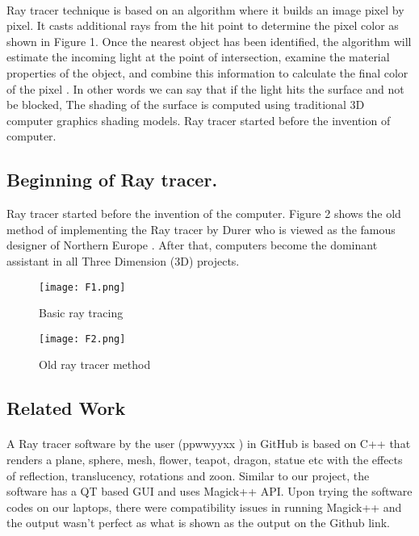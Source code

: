 \documentclass{article}
\begin{document}
\paragraph{}
Ray tracer technique is based on an algorithm where it builds an image pixel by pixel. It casts additional rays from the hit point to determine the pixel color as shown in Figure 1.
Once the nearest object has been identified, the algorithm will estimate the incoming light at the point of intersection, examine the material properties of the object, and combine this information to calculate the final color of the pixel \cite{2}. In other words we can say that if the light hits the surface and not be blocked,  The shading of the surface is computed using traditional 3D computer graphics shading models. 
Ray tracer started before the invention of computer. 


\subsection{Beginning of Ray tracer.} 
Ray tracer started before the invention of the computer. Figure 2 shows the old method of implementing the Ray tracer by Durer who is viewed as the famous designer of Northern Europe \cite{6}. After that, computers become the dominant assistant in all Three Dimension (3D) projects.

\begin{figure}
    \centering
    \texttt{[image: F1.png]}
    \caption{Basic ray tracing}
    \label{figure1}
\end{figure}

\begin{figure}[!h]
\centering
\texttt{[image: F2.png]}
\caption{Old ray tracer method \label{fig2}}
\end{figure}

\subsection{Related Work}
\paragraph{}
A Ray tracer software by the user (ppwwyyxx ) in GitHub is based on C++ that renders a plane, sphere, mesh, flower, teapot, dragon, statue etc with the effects of reflection, translucency, rotations and zoon. Similar to our project, the software has a QT based GUI and uses Magick++ API. Upon trying the software codes on our laptops, there were compatibility issues in running Magick++ and the output wasn't perfect as what is shown as the output on the Github link. \cite{7}
\end{document}
